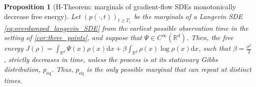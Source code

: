 \documentclass[twoside]{article}
\newcommand{\N}{\mathbb{N}}
\newcommand{\R} {\mathbb R}
\newcommand{\dx}{\mathrm{d}x}
\newtheorem{prop}[theorem]{Proposition}
\begin{document}



\begin{prop}[H-Theorem: marginals of gradient-flow SDEs monotonically decrease free energy] Let $(p(\cdot, t))_{t \ge T_1}$ be the marginals of a Langevin SDE \eqref{eq:overdamped_langevin_SDE} from the earliest possible observation time in the setting of \cref{cor:three_points}, and suppose that $\Psi \in C^\infty(\R^d)$. 
Then, the free energy $J(\rho) = \int_{\R^d} \Psi(x) \rho(x)\dx + \beta\int_{\R^d} \rho(x) \log \rho(x)\dx $, such that $\beta = \frac{\sigma^2}{2}$, strictly decreases in time, unless the process is at its stationary Gibbs distribution, $p_{\mathrm{eq}}$. Thus, $p_{\mathrm{eq}}$ is the only possible marginal that can repeat at distinct times.
\label{prop: decrease_free_energy}
\end{prop} 
\end{document}
